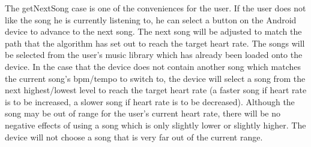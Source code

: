 \documentclass[letterpaper,english, 12pt]{scrreprt}
\begin{document}
The getNextSong case is one of the conveniences for the user. If the user does not like the song he is currently listening to, he can select a button on the Android device to advance to the next song. The next song will be adjusted to match the path that the algorithm has set out to reach the target heart rate. The songs will be selected from the user's music library which has already been loaded onto the device.
In the case that the device does not contain another song which matches the current song's bpm/tempo to switch to, the device will select a song from the next highest/lowest level to reach the target heart rate (a faster song if heart rate is to be increased, a slower song if heart rate is to be decreased). Although the song may be out of range for the user's current heart rate, there will be no negative effects of using a song which is only slightly lower or slightly higher. The device will not choose a song that is very far out of the current range. 
\end{document}
